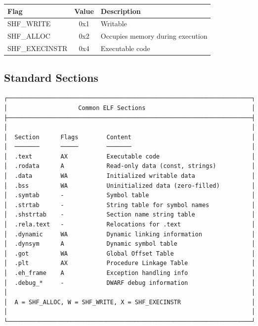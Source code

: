 \begin{tabular}{|l|c|l|}
\hline
\textbf{Flag} & \textbf{Value} & \textbf{Description} \\
\hline
SHF\_WRITE & 0x1 & Writable \\
\hline
SHF\_ALLOC & 0x2 & Occupies memory during execution \\
\hline
SHF\_EXECINSTR & 0x4 & Executable code \\
\hline
\end{tabular}

\subsection{Standard Sections}

\begin{verbatim}
┌─────────────────────────────────────────────────────────────────────┐
│                    Common ELF Sections                              │
├─────────────────────────────────────────────────────────────────────┤
│                                                                     │
│  Section      Flags        Content                                  │
│  ───────      ─────        ───────                                  │
│  .text        AX           Executable code                          │
│  .rodata      A            Read-only data (const, strings)          │
│  .data        WA           Initialized writable data                │
│  .bss         WA           Uninitialized data (zero-filled)         │
│  .symtab      -            Symbol table                             │
│  .strtab      -            String table for symbol names            │
│  .shstrtab    -            Section name string table                │
│  .rela.text   -            Relocations for .text                    │
│  .dynamic     WA           Dynamic linking information              │
│  .dynsym      A            Dynamic symbol table                     │
│  .got         WA           Global Offset Table                      │
│  .plt         AX           Procedure Linkage Table                  │
│  .eh_frame    A            Exception handling info                  │
│  .debug_*     -            DWARF debug information                  │
│                                                                     │
│  A = SHF_ALLOC, W = SHF_WRITE, X = SHF_EXECINSTR                    │
│                                                                     │
└─────────────────────────────────────────────────────────────────────┘
\end{verbatim}

